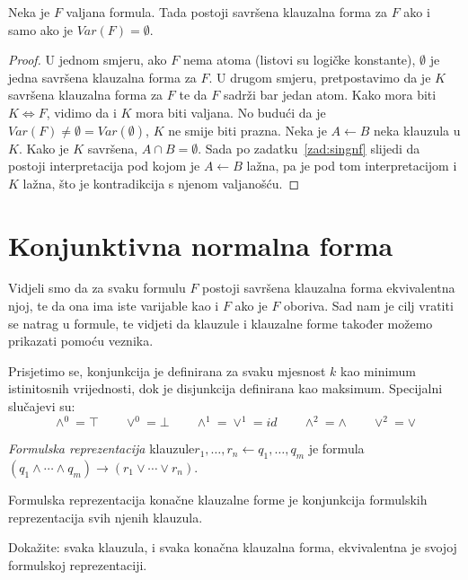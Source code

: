 \begin{teorem}
Neka je $F$ valjana formula. Tada postoji savršena klauzalna forma za $F$ ako i samo ako je $Var(F)=\emptyset$.
\end{teorem}

\begin{proof}
U jednom smjeru, ako $F$ nema atoma (listovi su logičke konstante), $\emptyset$ je jedna savršena klauzalna forma za $F$. U drugom smjeru,
pretpostavimo da je $K$ savršena klauzalna forma za $F$ te da $F$ sadrži bar jedan atom. Kako mora biti $K\Leftrightarrow F$, vidimo da i $K$ mora biti valjana. No budući da je $Var(F)\not=\emptyset=Var(\emptyset)$, $K$ ne smije biti prazna. Neka je $A\leftarrow B$ neka klauzula u $K$. Kako je $K$ savršena, $A\cap B=\emptyset$. Sada po zadatku~\ref{zad:singnf} slijedi da postoji interpretacija pod kojom je $A\leftarrow B$ lažna, pa je pod tom interpretacijom i $K$ lažna, što je kontradikcija s njenom valjanošću.
\end{proof}

\section{Konjunktivna normalna forma}

Vidjeli smo da za svaku formulu $F$ postoji savršena klauzalna forma ekvivalentna njoj, te da ona ima iste varijable kao i $F$ ako je $F$ oboriva. Sad nam je cilj vratiti se natrag u formule, te vidjeti da klauzule i klauzalne forme također možemo prikazati pomoću veznika.

Prisjetimo se, konjunkcija je definirana za svaku mjesnost $k$ kao minimum istinitosnih vrijednosti, dok je disjunkcija definirana kao maksimum. Specijalni slučajevi su:
$$\wedge^0=\top\qquad\vee^0=\bot\qquad\wedge^1=\vee^1=id\qquad\wedge^2=\wedge\qquad\vee^2=\vee$$

\begin{definicija}
\emph{Formulska reprezentacija} klauzule\newline $r_1,\ldots,r_n\leftarrow q_1,\ldots,q_m$ je formula $(q_1\wedge\cdots\wedge q_m)\to(r_1\vee\cdots\vee r_n)$.

Formulska reprezentacija konačne klauzalne forme je konjunkcija formulskih reprezentacija svih njenih klauzula.
\end{definicija}

\begin{zadatak}\label{zad:clfeqfr}
Dokažite: svaka klauzula, i svaka konačna klauzalna forma, ekvivalentna je svojoj formulskoj reprezentaciji.
\end{zadatak}

